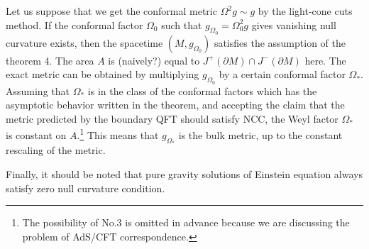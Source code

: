 \documentclass[12pt]{article}
\begin{document}
Let us suppose that we get the conformal metric $\Omega^2 g \sim g$ by the light-cone cuts method.
If the conformal factor $\Omega_0$ such that $g_{\Omega_0} = \Omega_0^2 g$ gives vanishing null curvature exists, then the spacetime $(M,g_{\Omega_0})$ satisfies the assumption of the theorem 4.
The area $A$ is (naively?) equal to $J^+(\partial M)\cap J^-(\partial M)$ here.
The exact metric can be obtained by multiplying $g_{\Omega_0}$ by a certain conformal factor $\Omega_\ast$.
Assuming that $\Omega_\ast$ is in the class of the conformal factors which has the asymptotic behavior written in the theorem, and accepting the claim that the metric predicted by the boundary QFT should satisfy NCC, the Weyl factor $\Omega_\ast$ is constant on $A$.\footnote{
The possibility of No.3 is omitted in advance because we are discussing the problem of AdS/CFT correspondence.
}
This means that $g_{\Omega_\ast}$ is the bulk metric, up to the constant rescaling of the metric.

Finally, it should be noted that pure gravity solutions of Einstein equation always satisfy zero null curvature condition.

 

\end{document}
